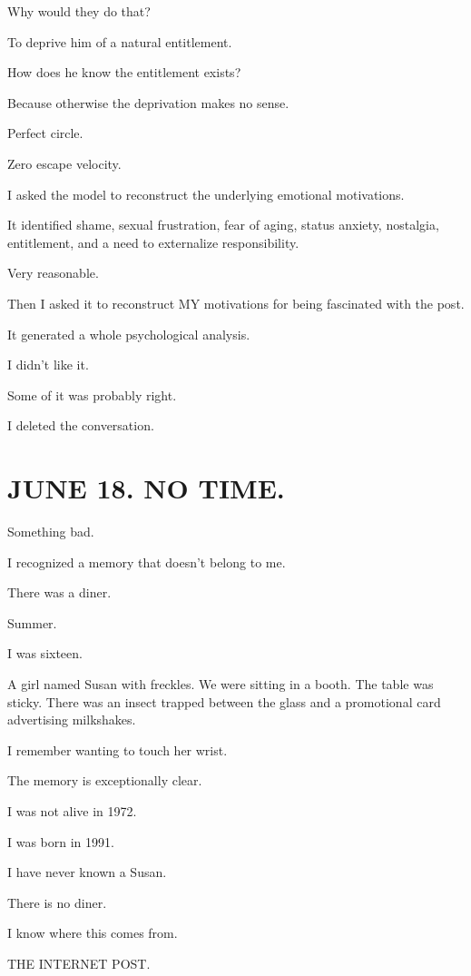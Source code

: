 \documentclass[11pt,oneside]{book}
\begin{document}
Why would they do that?

To deprive him of a natural entitlement.

How does he know the entitlement exists?

Because otherwise the deprivation makes no sense.

Perfect circle.

Zero escape velocity.

I asked the model to reconstruct the underlying emotional motivations.

It identified shame, sexual frustration, fear of aging, status anxiety, nostalgia, entitlement, and a need to externalize responsibility.

Very reasonable.

Then I asked it to reconstruct MY motivations for being fascinated with the post.

It generated a whole psychological analysis.

I didn't like it.

Some of it was probably right.

I deleted the conversation.

\section*{JUNE 18. NO TIME.}

Something bad.

I recognized a memory that doesn't belong to me.

There was a diner.

Summer.

I was sixteen.

A girl named Susan with freckles. We were sitting in a booth. The table was sticky. There was an insect trapped between the glass and a promotional card advertising milkshakes.

I remember wanting to touch her wrist.

The memory is exceptionally clear.

I was not alive in 1972.

I was born in 1991.

I have never known a Susan.

There is no diner.

I know where this comes from.

THE INTERNET POST.
\end{document}
